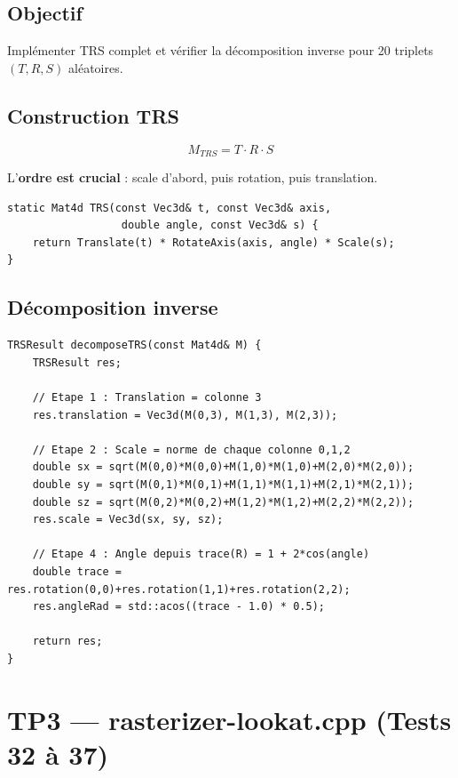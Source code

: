 \documentclass[12pt,a4paper]{report}
\begin{document}
\subsection{Objectif}

Implémenter TRS complet et vérifier la décomposition inverse
pour 20 triplets $(T, R, S)$ aléatoires.

\subsection{Construction TRS}

\begin{equation}
    M_{TRS} = T \cdot R \cdot S
\end{equation}

L'\textbf{ordre est crucial} : scale d'abord, puis rotation,
puis translation.

\begin{lstlisting}[caption={Mat4d --- TRS}]
static Mat4d TRS(const Vec3d& t, const Vec3d& axis,
                  double angle, const Vec3d& s) {
    return Translate(t) * RotateAxis(axis, angle) * Scale(s);
}
\end{lstlisting}

\subsection{Décomposition inverse}

\begin{lstlisting}[caption={trs-decomposition.cpp --- decomposeTRS}]
TRSResult decomposeTRS(const Mat4d& M) {
    TRSResult res;

    // Etape 1 : Translation = colonne 3
    res.translation = Vec3d(M(0,3), M(1,3), M(2,3));

    // Etape 2 : Scale = norme de chaque colonne 0,1,2
    double sx = sqrt(M(0,0)*M(0,0)+M(1,0)*M(1,0)+M(2,0)*M(2,0));
    double sy = sqrt(M(0,1)*M(0,1)+M(1,1)*M(1,1)+M(2,1)*M(2,1));
    double sz = sqrt(M(0,2)*M(0,2)+M(1,2)*M(1,2)+M(2,2)*M(2,2));
    res.scale = Vec3d(sx, sy, sz);

    // Etape 4 : Angle depuis trace(R) = 1 + 2*cos(angle)
    double trace = res.rotation(0,0)+res.rotation(1,1)+res.rotation(2,2);
    res.angleRad = std::acos((trace - 1.0) * 0.5);

    return res;
}
\end{lstlisting}

\section{TP3 --- rasterizer-lookat.cpp (Tests 32 à 37)}
\end{document}
